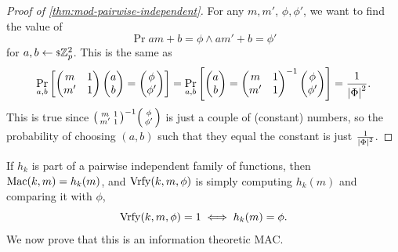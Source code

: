 \begin{proof}[Proof of \cref{thm:mod-pairwise-independent}]
	For any $m, m'$, $\phi, \phi'$, we want to find the value of
	\begin{equation*}
		\Pr{a m + b = \phi \land a m' + b = \phi'}
	\end{equation*}
	for $a,b \rand{\Integers^2_p}$.
	This is the same as
	\begin{equation*}
		\Pr[a,b]{
			\begin{pmatrix}
				m & 1 \\
				m' & 1
			\end{pmatrix}
			\begin{pmatrix}
			a \\ b
			\end{pmatrix}
			=
			\begin{pmatrix}
			\phi \\ \phi'
			\end{pmatrix}
		}
		=
		\Pr[a,b]{
			\begin{pmatrix}
			a \\ b
			\end{pmatrix}
			=
			{
			\begin{pmatrix}
				m & 1 \\
				m' & 1
			\end{pmatrix}
			}^{-1}
			\begin{pmatrix}
			\phi \\ \phi'
			\end{pmatrix}
		}
		=
		\frac{1}{\abs{\GenericAuthSpace}^2}.
	\end{equation*}
	This is true since 
	${\begin{psmallmatrix}
		m & 1 \\
		m' & 1
	\end{psmallmatrix}
	}^{-1}
	\begin{psmallmatrix}
	\phi \\ \phi'
	\end{psmallmatrix}$
	is just a couple of (constant) numbers, so the probability of choosing $(a,b)$ such that they equal the constant is just $\frac{1}{\abs{\GenericAuthSpace}^2}$.
\end{proof}

If $h_k$ is part of a pairwise independent family of functions, then $\GenericMac(k,m) = h_k(m)$, and $\GenericVrfy(k,m,\phi)$ is simply computing $h_k(m)$ and comparing it with $\phi$, \ie
\begin{equation*}
	\GenericVrfy(k,m,\phi) = 1 \iff h_k(m) = \phi.
\end{equation*}
We now prove that this is an information theoretic \ac{MAC}.

